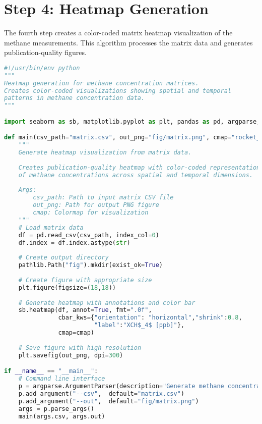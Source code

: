 \section{Step 4: Heatmap Generation}
\label{sec:appendixB_step4}

The fourth step creates a color-coded matrix heatmap visualization of the methane measurements. This algorithm processes the matrix data and generates publication-quality figures.

\begin{lstlisting}[language=Python, caption=Heatmap Generation Algorithm, label=alg:step04_heatmap, breaklines=true]
#!/usr/bin/env python
"""
Heatmap generation for methane concentration matrices.
Creates color-coded visualizations showing spatial and temporal
patterns in methane concentration data.
"""

import seaborn as sb, matplotlib.pyplot as plt, pandas as pd, argparse, pathlib

def main(csv_path="matrix.csv", out_png="fig/matrix.png", cmap="rocket_r"):
    """
    Generate heatmap visualization from matrix data.
    
    Creates publication-quality heatmap with color-coded representation
    of methane concentrations across spatial and temporal dimensions.
    
    Args:
        csv_path: Path to input matrix CSV file
        out_png: Path for output PNG figure
        cmap: Colormap for visualization
    """
    # Load matrix data
    df = pd.read_csv(csv_path, index_col=0)
    df.index = df.index.astype(str)
    
    # Create output directory
    pathlib.Path("fig").mkdir(exist_ok=True)
    
    # Create figure with appropriate size
    plt.figure(figsize=(18,18))
    
    # Generate heatmap with annotations and color bar
    sb.heatmap(df, annot=True, fmt=".0f",
               cbar_kws={"orientation": "horizontal","shrink":0.8,
                         "label":"XCH$_4$ [ppb]"},
               cmap=cmap)
    
    # Save figure with high resolution
    plt.savefig(out_png, dpi=300)

if __name__ == "__main__":
    # Command line interface
    p = argparse.ArgumentParser(description="Generate methane concentration heatmap")
    p.add_argument("--csv",  default="matrix.csv")
    p.add_argument("--out",  default="fig/matrix.png")
    args = p.parse_args()
    main(args.csv, args.out)
\end{lstlisting}

